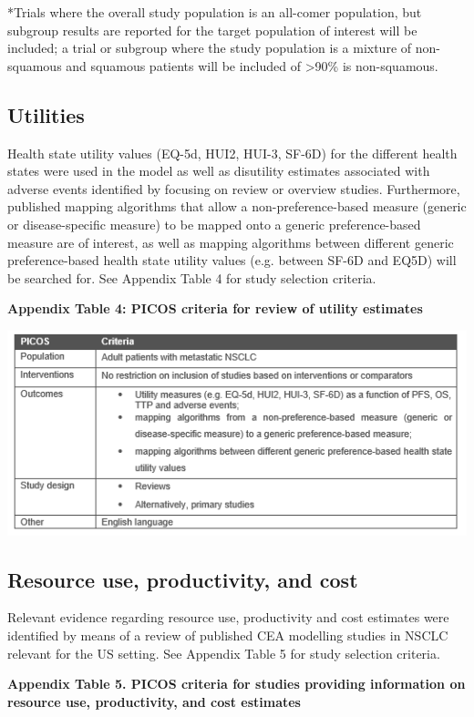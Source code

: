 \documentclass[11pt,final,fleqn]{article}\usepackage[]{graphicx}\usepackage[]{color}
\theoremstyle{plain}
\begin{document}
{\begin{appendices}
*Trials where the overall study population is an all-comer population, but subgroup results are reported for the target population of interest will be included; a trial or subgroup where the study population is a mixture of non-squamous and squamous  patients will be included of >90\% is non-squamous. 

\subsection{Utilities}

Health state utility values (EQ-5d, HUI2, HUI-3, SF-6D) for the different health states were used in the model as well as disutility estimates associated with adverse events identified by focusing on review or overview studies. Furthermore, published mapping algorithms that allow a non-preference-based measure (generic or disease-specific measure) to be mapped onto a generic preference-based measure are of interest, as well as mapping algorithms between different generic preference-based health state utility values (e.g. between SF-6D and EQ5D) will be searched for. See Appendix Table 4 for study selection criteria.

\textbf{Appendix Table 4: PICOS criteria for review of utility estimates}

\includegraphics[scale=1]{Appendix Table 4.PNG} 

\subsection{Resource use, productivity, and cost}

Relevant evidence regarding resource use, productivity and cost estimates were identified by means of a review of published CEA modelling studies in NSCLC relevant for the US setting.  See Appendix Table 5 for study selection criteria.

\textbf{Appendix Table 5. PICOS criteria for studies providing information on resource use, productivity, and cost estimates} 


\end{appendices}}
\end{document}
